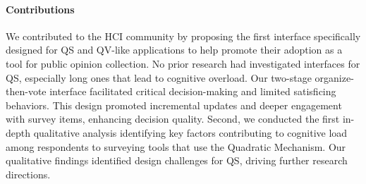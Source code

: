 \paragraph{Contributions}
We contributed to the HCI community by proposing the first interface specifically designed for QS and QV-like applications 
to help promote their adoption as a tool for public opinion collection. No prior research had investigated interfaces for QS, especially long ones that lead to cognitive overload. Our two-stage organize-then-vote interface facilitated critical decision-making and limited satisficing behaviors. This design promoted incremental updates and deeper engagement with survey items, enhancing decision quality. Second, we conducted the first in-depth qualitative analysis identifying key factors contributing to cognitive load among respondents to surveying tools that use the Quadratic Mechanism. Our qualitative findings identified design challenges for QS, driving further research directions.







